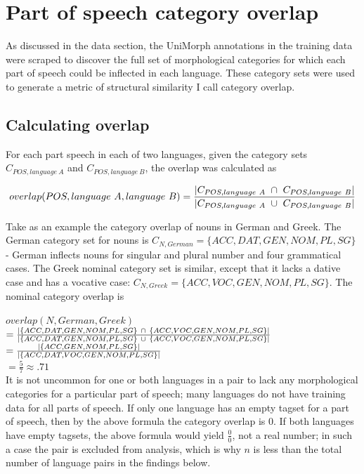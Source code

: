 \section{Part of speech category overlap}
\label{sec:CO}

As discussed in the data section, the UniMorph annotations in the training data were scraped to discover the full set of morphological categories for which each part of speech could be inflected in each language. These category sets were used to generate a metric of structural similarity I call category overlap.

\subsection{Calculating overlap}

For each part speech in each of two languages, given the category sets $C_{POS, language\ A}$ and $C_{POS, language\ B}$, the overlap was calculated as

\[overlap(POS, language\ A, language\ B) = \frac{\abs*{C_{POS, language\ A}\ \cap\ C_{POS, language\ B}}}{\abs*{C_{POS, language\ A}\ \cup\ C_{POS, language\ B}}}\]

Take as an example the category overlap of nouns in German and Greek. The German category set for nouns is $C_{N,German} = \{ACC, DAT, GEN, NOM, PL, SG\}$ - German inflects nouns for singular and plural number and four grammatical cases. The Greek nominal category set is similar, except that it lacks a dative case and has a vocative case: $C_{N,Greek} = \{ACC, VOC, GEN, NOM, PL, SG\}$. The nominal category overlap is 

$overlap(N, German, Greek)$\\
$= \frac{\abs*{\{ACC, DAT, GEN, NOM, PL, SG\}\ \cap\ \{ACC, VOC, GEN, NOM, PL, SG\}}}{\abs*{\{ACC, DAT, GEN, NOM, PL, SG\}\ \cup\ \{ACC, VOC, GEN, NOM, PL, SG\}}}$\\
$= \frac{\abs*{\{ACC, GEN, NOM, PL, SG\}}}{\abs*{\{ACC, DAT, VOC, GEN, NOM, PL, SG\}}}$\\
$= \frac{5}{7} \approx .71$\\

It is not uncommon for one or both languages in a pair to lack any morphological categories for a particular part of speech; many languages do not have training data for all parts of speech. If only one language has an empty tagset for a part of speech, then by the above formula the category overlap is 0. If both languages have empty tagsets, the above formula would yield $\frac{0}{0}$, not a real number; in such a case the pair is excluded from analysis, which is why $n$ is less than the total number of language pairs in the findings below.

